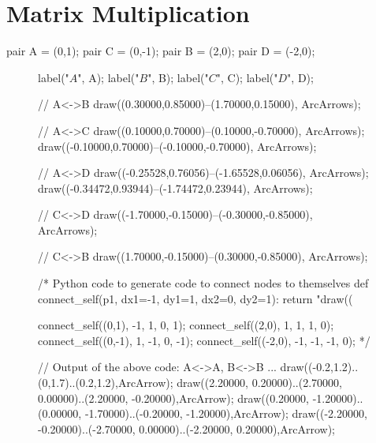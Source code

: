 \documentclass[../textbook.tex]{subfiles}
\begin{document}
\section{Matrix Multiplication}

\newcommand{\indsize}{\scriptsize}
\newcommand{\colind}[2]{\displaystyle\smash{\mathop{#1}^{\raisebox{.5\normalbaselineskip}{$#2$}}}}
\newcommand{\rowind}[1]{\mbox{$#1$}}

\begin{asydef}
pair A = (0,1);
pair C = (0,-1);
pair B = (2,0);
pair D = (-2,0);
\end{asydef}

\begin{figure}[h]
	\begin{center}
		\begin{minipage}[b]{0.45\textwidth}
			\centering
			\begin{asy}[width=0.7\textwidth]

				label("$A$", A);
				label("$B$", B);
				label("$C$", C);
				label("$D$", D);

				// A<->B
				draw((0.30000,0.85000)--(1.70000,0.15000), ArcArrows);

				// A<->C
				draw((0.10000,0.70000)--(0.10000,-0.70000), ArcArrows);
				draw((-0.10000,0.70000)--(-0.10000,-0.70000), ArcArrows);

				// A<->D
				draw((-0.25528,0.76056)--(-1.65528,0.06056), ArcArrows);
				draw((-0.34472,0.93944)--(-1.74472,0.23944), ArcArrows);

				// C<->D
				draw((-1.70000,-0.15000)--(-0.30000,-0.85000), ArcArrows);

				// C<->B
				draw((1.70000,-0.15000)--(0.30000,-0.85000), ArcArrows);

				/*
				Python code to generate code to connect nodes to themselves
				def connect_self(p1, dx1=-1, dy1=1, dx2=0, dy2=1):
					return "draw((%

				connect_self((0,1), -1, 1, 0, 1);
				connect_self((2,0), 1, 1, 1, 0);
				connect_self((0,-1), 1, -1, 0, -1);
				connect_self((-2,0), -1, -1, -1, 0);
				*/

				// Output of the above code: A<->A, B<->B ...
				draw((-0.2,1.2)..(0,1.7)..(0.2,1.2),ArcArrow);
				draw((2.20000, 0.20000)..(2.70000, 0.00000)..(2.20000, -0.20000),ArcArrow);
				draw((0.20000, -1.20000)..(0.00000, -1.70000)..(-0.20000, -1.20000),ArcArrow);
				draw((-2.20000, -0.20000)..(-2.70000, 0.00000)..(-2.20000, 0.20000),ArcArrow);
			\end{asy}
		\end{minipage}
		\hfill
		\begin{minipage}[b]{0.45\textwidth}
			\centering
			\begin{asy}[width=0.7\textwidth]


\end{asy}
\end{minipage}
\end{center}
\end{figure}
\end{document}
